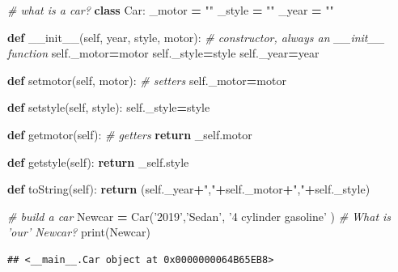 \documentclass[]{book}
\newenvironment{Shaded}{\begin{snugshade}}{\end{snugshade}}
\newcommand{\KeywordTok}[1]{\textcolor[rgb]{0.13,0.29,0.53}{\textbf{#1}}}
\newcommand{\StringTok}[1]{\textcolor[rgb]{0.31,0.60,0.02}{#1}}
\newcommand{\CommentTok}[1]{\textcolor[rgb]{0.56,0.35,0.01}{\textit{#1}}}
\newcommand{\FunctionTok}[1]{\textcolor[rgb]{0.00,0.00,0.00}{#1}}
\newcommand{\VariableTok}[1]{\textcolor[rgb]{0.00,0.00,0.00}{#1}}
\newcommand{\ControlFlowTok}[1]{\textcolor[rgb]{0.13,0.29,0.53}{\textbf{#1}}}
\newcommand{\OperatorTok}[1]{\textcolor[rgb]{0.81,0.36,0.00}{\textbf{#1}}}
\newcommand{\BuiltInTok}[1]{#1}
\newcommand{\NormalTok}[1]{#1}
\theoremstyle{definition}
\theoremstyle{definition}
\theoremstyle{definition}
\theoremstyle{remark}
\begin{document}
\begin{Shaded}
\begin{Highlighting}[]
\CommentTok{# what is a car?}
\KeywordTok{class}\NormalTok{ Car:}
\NormalTok{  _motor }\OperatorTok{=} \StringTok{""}
\NormalTok{  _style }\OperatorTok{=} \StringTok{""}
\NormalTok{  _year }\OperatorTok{=} \StringTok{""}
  
  \KeywordTok{def} \FunctionTok{__init__}\NormalTok{(}\VariableTok{self}\NormalTok{, year, style, motor):      }\CommentTok{# constructor, always an __init__ function}
    \VariableTok{self}\NormalTok{._motor}\OperatorTok{=}\NormalTok{motor}
    \VariableTok{self}\NormalTok{._style}\OperatorTok{=}\NormalTok{style}
    \VariableTok{self}\NormalTok{._year}\OperatorTok{=}\NormalTok{year}
    
  \KeywordTok{def}\NormalTok{ setmotor(}\VariableTok{self}\NormalTok{, motor):       }\CommentTok{# setters}
    \VariableTok{self}\NormalTok{._motor}\OperatorTok{=}\NormalTok{motor}
    
  \KeywordTok{def}\NormalTok{ setstyle(}\VariableTok{self}\NormalTok{, style):}
    \VariableTok{self}\NormalTok{._style}\OperatorTok{=}\NormalTok{style}
    
  \KeywordTok{def}\NormalTok{ getmotor(}\VariableTok{self}\NormalTok{):              }\CommentTok{# getters}
    \ControlFlowTok{return}\NormalTok{ _self.motor}
    
  \KeywordTok{def}\NormalTok{ getstyle(}\VariableTok{self}\NormalTok{): }
    \ControlFlowTok{return}\NormalTok{ _self.style}
    
  \KeywordTok{def}\NormalTok{ toString(}\VariableTok{self}\NormalTok{):}
    \ControlFlowTok{return}\NormalTok{ (}\VariableTok{self}\NormalTok{._year}\OperatorTok{+}\StringTok{","}\OperatorTok{+}\VariableTok{self}\NormalTok{._motor}\OperatorTok{+}\StringTok{","}\OperatorTok{+}\VariableTok{self}\NormalTok{._style)}
    
    
\CommentTok{# build a car}
\NormalTok{Newcar }\OperatorTok{=}\NormalTok{ Car(}\StringTok{'2019'}\NormalTok{,}\StringTok{'Sedan'}\NormalTok{, }\StringTok{'4 cylinder gasoline'}\NormalTok{ )}
\CommentTok{# What is 'our' Newcar?}
\BuiltInTok{print}\NormalTok{(Newcar)}
\end{Highlighting}
\end{Shaded}

\begin{verbatim}
## <__main__.Car object at 0x0000000064B65EB8>
\end{verbatim}
\end{document}
